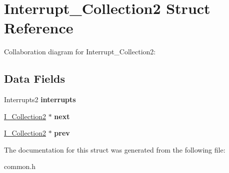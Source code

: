 \hypertarget{struct_interrupt___collection2}{}\section{Interrupt\+\_\+\+Collection2 Struct Reference}
\label{struct_interrupt___collection2}


Collaboration diagram for Interrupt\+\_\+\+Collection2\+:
\subsection*{Data Fields}
\begin{DoxyCompactItemize}
\item 
Interrupts2 {\bfseries interrupts}\hypertarget{struct_interrupt___collection2_afe6ba6f316b71531f258a7b5d8206e8f}{}\label{struct_interrupt___collection2_afe6ba6f316b71531f258a7b5d8206e8f}

\item 
\hyperlink{struct_interrupt___collection2}{I\+\_\+\+Collection2} $\ast$ {\bfseries next}\hypertarget{struct_interrupt___collection2_ad1260e63c64495d53a6d560e0de81354}{}\label{struct_interrupt___collection2_ad1260e63c64495d53a6d560e0de81354}

\item 
\hyperlink{struct_interrupt___collection2}{I\+\_\+\+Collection2} $\ast$ {\bfseries prev}\hypertarget{struct_interrupt___collection2_ac36f4dac4ba924b695f6253546a9b9ba}{}\label{struct_interrupt___collection2_ac36f4dac4ba924b695f6253546a9b9ba}

\end{DoxyCompactItemize}


The documentation for this struct was generated from the following file\+:\begin{DoxyCompactItemize}
\item 
common.\+h\end{DoxyCompactItemize}
